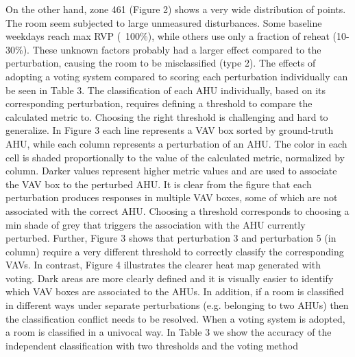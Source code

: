 On the other hand, zone 461 (Figure 2) shows a very wide distribution of points. The room seem subjected to large unmeasured disturbances. Some baseline weekdays reach max RVP (~100\%), while others use only a fraction of reheat (10-30\%). These unknown factors probably had a larger effect compared to the perturbation, causing the room to be misclassified (type 2).
The effects of adopting a voting system compared to scoring each perturbation individually can be seen in Table 3. The classification of each AHU individually, based on its corresponding perturbation, requires defining a threshold to compare the calculated metric to. Choosing the right threshold is challenging and hard to generalize. In Figure 3 each line represents a VAV box sorted by ground-truth AHU, while each column represents a perturbation of an AHU. The color in each cell is shaded proportionally to the value of the calculated metric, normalized by column. Darker values represent higher metric values and are used to associate the VAV box to the perturbed AHU. It is clear from the figure that each perturbation produces responses in multiple VAV boxes, some of which are not associated with the correct AHU. Choosing a threshold corresponds to choosing a min shade of grey that triggers the association with the AHU currently perturbed. Further, Figure 3 shows that perturbation 3 and perturbation 5 (in column) require a very different threshold to correctly classify the corresponding VAVs. In contrast, Figure 4 illustrates the clearer heat map generated with voting. Dark areas are more clearly defined and it is visually easier to identify which VAV boxes are associated to the AHUs.
In addition, if a room is classified in different ways under separate perturbations (e.g. belonging to two AHUs) then the classification conflict needs to be resolved. When a voting system is adopted, a room is classified in a univocal way. In Table 3 we show the accuracy of the independent classification with two thresholds and the voting method 


